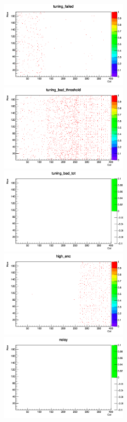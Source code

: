 \begin{figure}[bpt]
\begin{minipage}{0.45\hsize}
  \end{minipage}
  \begin{minipage}{0.45\hsize}
    \includegraphics[width=6.5cm]{./data/analysis_result/tuning_failed.png}
  \end{minipage}
  \begin{minipage}{0.45\hsize}
    \includegraphics[width=6.5cm]{./data/analysis_result/tuning_bad_threshold.png}
  \end{minipage}
  \begin{minipage}{0.45\hsize}
    \includegraphics[width=6.5cm]{./data/analysis_result/tuning_bad_tot.png}
  \end{minipage}
  \begin{minipage}{0.45\hsize}
    \includegraphics[width=6.5cm]{./data/analysis_result/high_enc.png}
  \end{minipage}
  \includegraphics[width=6.5cm]{./data/analysis_result/noisy.png}


\end{figure}
